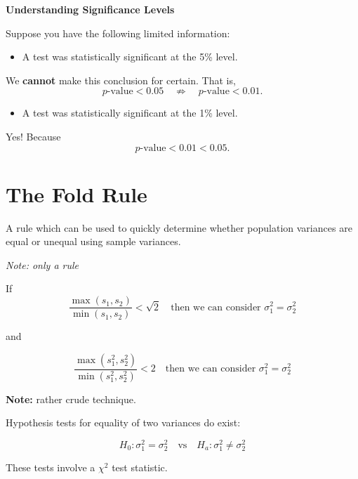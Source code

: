 \textbf{Understanding Significance Levels}

Suppose you have the following limited information:

\begin{itemize}
    \item A test was statistically significant at the 5\% level.
\end{itemize}
    
We \textbf{cannot} make this conclusion for certain. That is, 
    \[
    p\text{-value} < 0.05 \quad \not\Rightarrow \quad p\text{-value} < 0.01.
    \]
\begin{itemize}
\item A test was statistically significant at the 1\% level.
\end{itemize}
    
  Yes! Because
    \[
    p\text{-value} < 0.01 < 0.05.
    \]


\section{The Fold Rule}

A rule which can be used to quickly determine whether population variances are equal or unequal using sample variances.

\textit{Note: only a rule}

\medskip

If 
\[
\frac{\max(s_1, s_2)}{\min(s_1, s_2)} < \sqrt{2} 
\quad \text{then we can consider } \sigma_1^2 = \sigma_2^2
\]

and

\[
\frac{\max(s_1^2, s_2^2)}{\min(s_1^2, s_2^2)} < 2 
\quad \text{then we can consider } \sigma_1^2 = \sigma_2^2
\]

\medskip

\textbf{Note:} rather crude technique.

Hypothesis tests for equality of two variances do exist:

\[
H_0: \sigma_1^2 = \sigma_2^2 \quad \text{vs} \quad H_a: \sigma_1^2 \neq \sigma_2^2
\]

These tests involve a \(\chi^2\) test statistic.







